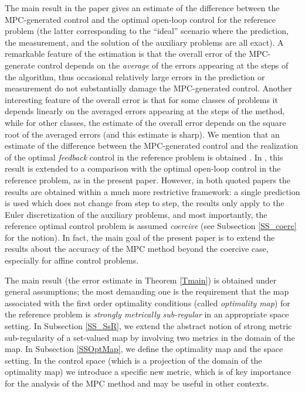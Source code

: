 \documentclass[11pt]{article}
\begin{document}
The main result in the paper gives an estimate of the difference
between the MPC-generated control and the optimal open-loop control for the reference problem
(the latter corresponding to the ``ideal'' scenario where the prediction, the measurement, and the solution 
of the auxiliary problems are all exact). A remarkable feature of the estimation is that the overall error of 
the MPC-generate control depends on the {\em average} of the errors appearing at the steps of the algorithm, 
thus occasional relatively large errors in the prediction or measurement do not substantially damage the MPC-generated control.
Another interesting feature of the overall error is that for some classes of problems it depends linearly on the averaged 
errors appearing at the steps of the method, while for other classes, the estimate of the overall error 
depends on the square root of the averaged errors (and this estimate is sharp).
We mention that an estimate of the difference between the MPC-generated control 
and the realization of the optimal {\em feedback} control in the reference problem 
is obtained \cite{AD+IK+MK+VV+PV-20}. In \cite{AD+IK+MK+VV-20}, this result is extended to 
a comparison with  the optimal open-loop control in the reference problem, as in the present paper.
However, in both quoted papers the results are obtained within a much more restrictive framework:
a single prediction is used which does not change from step to step, the results only apply to the Euler discretization
of the auxiliary problems, and most importantly, the reference optimal control problem is assumed {\em coercive}
(see Subsection  \ref{SS_coerc} for the notion). In fact, the main goal of the present paper is to extend 
the results about the accuracy of the MPC method beyond the coercive case, especially for affine control
problems. 

The main result (the error estimate in Theorem \ref{Tmain}) is obtained under general assumptions;
the most demanding one is the requirement that the 
map associated with the first order optimality conditions (called {\em optimality map})
for the reference problem is {\em strongly metrically sub-regular}
in an appropriate space setting. In Subsection \ref{SS_SsR}, we extend the abstract notion of  
strong metric sub-regularity of a set-valued map by involving two metrics in the domain of  the map.
In Subsection \ref{SSOptMap}, we define the optimality map and the space setting. In the control space
(which is a projection of the domain of  the optimality map) 
we introduce a specific new metric, which is of key importance for the analysis of the MPC method
and may be useful in other contexts.  
\end{document}
